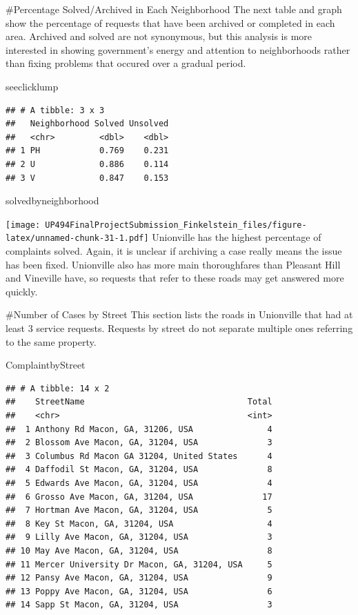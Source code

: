 \documentclass[
]{article}
\newenvironment{Shaded}{\begin{snugshade}}{\end{snugshade}}
\newcommand{\NormalTok}[1]{#1}
\begin{document}
\#Percentage Solved/Archived in Each Neighborhood The next table and
graph show the percentage of requests that have been archived or
completed in each area. Archived and solved are not synonymous, but this
analysis is more interested in showing government's energy and attention
to neighborhoods rather than fixing problems that occured over a gradual
period.

\begin{Shaded}
\begin{Highlighting}[]
\NormalTok{seeclicklump}
\end{Highlighting}
\end{Shaded}

\begin{verbatim}
## # A tibble: 3 x 3
##   Neighborhood Solved Unsolved
##   <chr>         <dbl>    <dbl>
## 1 PH            0.769    0.231
## 2 U             0.886    0.114
## 3 V             0.847    0.153
\end{verbatim}

\begin{Shaded}
\begin{Highlighting}[]
\NormalTok{solvedbyneighborhood}
\end{Highlighting}
\end{Shaded}

\texttt{[image: UP494FinalProjectSubmission\_Finkelstein\_files/figure-latex/unnamed-chunk-31-1.pdf]}
Unionville has the highest percentage of complaints solved. Again, it is
unclear if archiving a case really means the issue has been fixed.
Unionville also has more main thoroughfares than Pleasant Hill and
Vineville have, so requests that refer to these roads may get answered
more quickly.

\#Number of Cases by Street This section lists the roads in Unionville
that had at least 3 service requests. Requests by street do not separate
multiple ones referring to the same property.

\begin{Shaded}
\begin{Highlighting}[]
\NormalTok{ComplaintbyStreet}
\end{Highlighting}
\end{Shaded}

\begin{verbatim}
## # A tibble: 14 x 2
##    StreetName                                 Total
##    <chr>                                      <int>
##  1 Anthony Rd Macon, GA, 31206, USA               4
##  2 Blossom Ave Macon, GA, 31204, USA              3
##  3 Columbus Rd Macon GA 31204, United States      4
##  4 Daffodil St Macon, GA, 31204, USA              8
##  5 Edwards Ave Macon, GA, 31204, USA              4
##  6 Grosso Ave Macon, GA, 31204, USA              17
##  7 Hortman Ave Macon, GA, 31204, USA              5
##  8 Key St Macon, GA, 31204, USA                   4
##  9 Lilly Ave Macon, GA, 31204, USA                3
## 10 May Ave Macon, GA, 31204, USA                  8
## 11 Mercer University Dr Macon, GA, 31204, USA     5
## 12 Pansy Ave Macon, GA, 31204, USA                9
## 13 Poppy Ave Macon, GA, 31204, USA                6
## 14 Sapp St Macon, GA, 31204, USA                  3
\end{verbatim}
\end{document}
